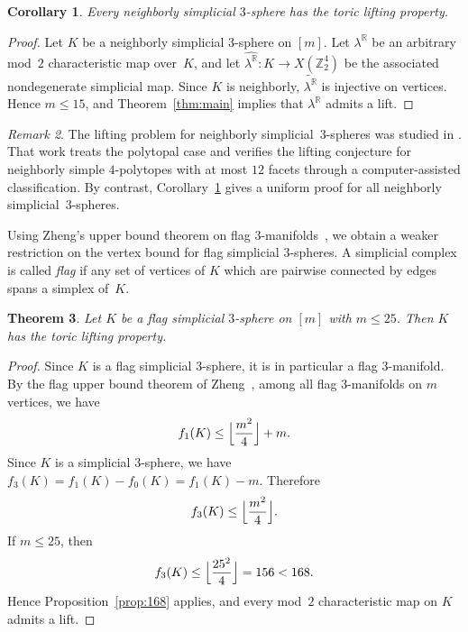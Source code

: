 \documentclass{amsart}
\newcommand{\Z}{\mathbb{Z}}
\newcommand{\R}{\mathbb{R}}
\newtheorem{theorem}{Theorem}[section]
\newtheorem{corollary}[theorem]{Corollary}
\theoremstyle{definition}
\theoremstyle{remark}
\newtheorem{remark}[theorem]{Remark}
\begin{document}
\begin{corollary}\label{cor:neighborly}
    Every neighborly simplicial $3$-sphere has the toric lifting property.  
\end{corollary}
\begin{proof} 
    Let $K$ be a neighborly simplicial $3$-sphere on $[m]$.
    Let $\lambda^\R$ be an arbitrary mod~$2$ characteristic map over~$K$, and let $\widehat{\lambda^{\R}}\colon K\to X(\Z_2^4)$ be the associated nondegenerate simplicial map.
    Since $K$ is neighborly, $\widetilde{\lambda^{\R}}$ is injective on vertices.
    Hence $m\leq 15$, and Theorem~\ref{thm:main} implies that $\lambda^\R$ admits a lift.
\end{proof}
\begin{remark} 
    The lifting problem for neighborly simplicial~$3$-spheres was studied in \cite{Baralic-Milenkovic2022}.
    That work treats the polytopal case and verifies the lifting conjecture for neighborly simple $4$-polytopes with at most $12$ facets through a computer-assisted classification. 
    By contrast, Corollary~\ref{cor:neighborly} gives a uniform proof for all neighborly simplicial~$3$-spheres.
\end{remark}

Using Zheng’s upper bound theorem on flag 3-manifolds~\cite{Zheng2017}, we obtain a weaker restriction on the vertex bound for flag simplicial 3-spheres.
A simplicial complex is called \emph{flag} if any set of vertices of $K$ which are pairwise connected by edges spans a simplex of~$K$.

\begin{theorem}\label{thm:flag25}
    Let $K$ be a flag simplicial $3$-sphere on $[m]$ with $m\le 25$.
    Then $K$ has the toric lifting property.
\end{theorem}
\begin{proof}
    Since $K$ is a flag simplicial $3$-sphere, it is in particular a flag $3$-manifold.
    By the flag upper bound theorem of Zheng~\cite{Zheng2017}, among all flag $3$-manifolds on $m$ vertices, we have
    $$
        f_1(K)\leq \Bigl\lfloor \frac{m^2}{4}\Bigr\rfloor + m.
    $$
    Since $K$ is a simplicial $3$-sphere, we have $f_3(K)=f_1(K)-f_0(K)=f_1(K)-m$.
    Therefore
    $$
        f_3(K)\le \Bigl\lfloor \frac{m^2}{4}\Bigr\rfloor.
    $$
    If $m\le 25$, then
    $$
        f_3(K)\le \Bigl\lfloor \frac{25^2}{4}\Bigr\rfloor = 156 < 168.
    $$
    Hence Proposition~\ref{prop:168} applies, and every mod~$2$ characteristic map on $K$ admits a lift.
\end{proof}
\end{document}
